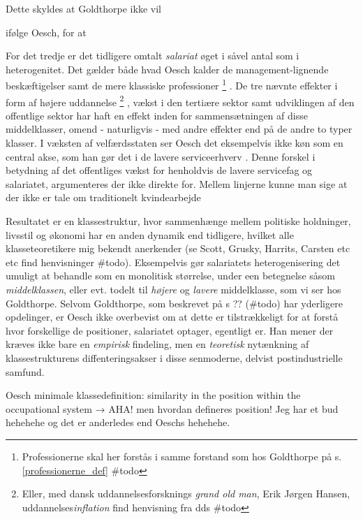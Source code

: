  Dette skyldes at Goldthorpe ikke vil 


ifølge Oesch, for at 



For det tredje er det tidligere omtalt \emph{salariat} øget i såvel antal som i heterogenitet. Det gælder både hvad Oesch kalder de management-lignende beskæftigelser samt de mere klassiske professioner%
%
\footnote{Professionerne skal her forstås i samme forstand som hos Goldthorpe på s. \ref{professionerne_def} \#todo}%
%
. De tre nævnte effekter i form af højere uddannelse%
%
\footnote{Eller,  med dansk uddannelsesforsknings \emph{grand old man}, Erik Jørgen Hansen, uddannelses\emph{inflation} find henvisning fra dds \#todo}%
%
, vækst i den tertiære sektor samt udviklingen af den offentlige sektor har haft en effekt inden for sammensætningen af disse middelklasser, omend - naturligvis - med andre effekter end på de andre to typer klasser. I væksten af velfærdsstaten ser Oesch det eksempelvis ikke køn som en central akse, som han gør det i de lavere serviceerhverv \parencite[2f]{Oesch2006a}. 
Denne forskel i betydning af det offentliges vækst for henholdvis de lavere servicefag og salariatet, argumenteres der ikke direkte for. Mellem linjerne kunne man sige at der ikke er tale om traditionelt kvindearbejde 

Resultatet er en klassestruktur, hvor sammenhænge mellem politiske holdninger, livsstil og økonomi har en anden dynamik end tidligere, hvilket alle klasseteoretikere mig bekendt anerkender (se Scott, Grusky, Harrits, Carsten etc etc find henvisninger \#todo). Eksempelvis gør salariatets heterogenisering det umuligt at behandle som en monolitisk størrelse, under een betegnelse såsom \emph{middelklassen}, eller evt. todelt til \emph{højere} og \emph{lavere} middelklasse, som vi ser hos Goldthorpe. Selvom Goldthorpe, som beskrevet på s ?? (\#todo) har yderligere opdelinger, er Oesch ikke overbevist om at dette er tilstrækkeligt for at forstå hvor forskellige de positioner, salariatet optager, egentligt er. Han mener der kræves ikke bare en \emph{empirisk} findeling, men en \emph{teoretisk} nytænkning af klassestrukturens diffenteringsakser i disse senmoderne, delvist postindustrielle samfund. 

\iffalse
\label{iffalse}

Oesch minimale klassedefinition: similarity in the position within the occupational system \parencite[16]{Oesch2006a}
 	→ AHA! men hvordan defineres position! Jeg har et bud hehehehe og det er anderledes end Oeschs hehehehe.

